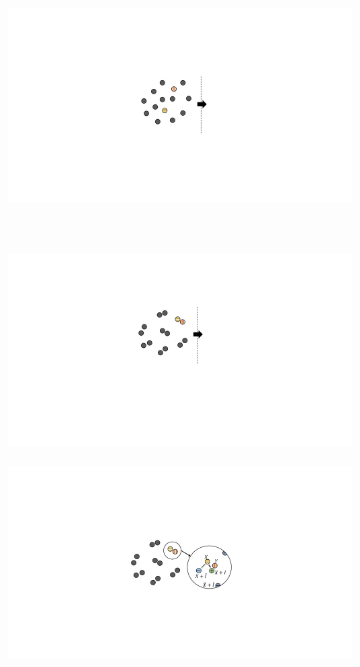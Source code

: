 
\begin{figure}[H]
    \centering
    \begin{subfigure}[b]{0.31\textwidth} %
      \includegraphics[width=\textwidth]{Img/fig_5_cat_a.pdf}
      \caption{}
      \label{fig:5_cat_a}
    \end{subfigure}%
    ~%
    \begin{subfigure}[b]{0.26\textwidth} %
      \includegraphics[width=\textwidth]{Img/fig_5_cat_b.pdf}
      \caption{}
      \label{fig:5_cat_b}
    \end{subfigure}
    \begin{subfigure}[b]{0.39\textwidth} %
      \includegraphics[width=\textwidth]{Img/fig_5_cat_c.pdf}

\end{subfigure}
\end{figure}
